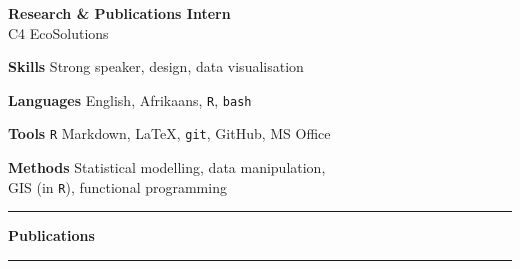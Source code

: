 \documentclass[10pt]{article}
\begin{document}


\begin{multicols}{2} %

{\Large \textbf{Research \& Publications Intern}} \\
\hspace{2em} C4 EcoSolutions

\bigskip

\textbf{Skills   }     \hfill      Strong speaker, design, data visualisation

\textbf{Languages}     \hfill   English, Afrikaans, \texttt{R}, \texttt{bash}

\textbf{Tools    }     \hfill                            \texttt{R} Markdown,
                                        {\selectfont \LaTeX},
                                              \texttt{git}, GitHub, MS Office

\textbf{Methods  }     \hfill       Statistical modelling, data manipulation, \\
                       \hfill     GIS (in \texttt{R}), functional programming

\columnbreak



\end{multicols} %

\hrule

\vskip10pt

\textbf{\large Publications} %

\vskip5pt



\vskip10pt

\hrule
\end{document}
